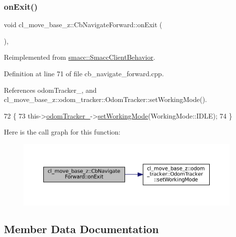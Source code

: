 \subsubsection{\texorpdfstring{on\+Exit()}{onExit()}}
{\footnotesize\ttfamily void cl\+\_\+move\+\_\+base\+\_\+z\+::\+Cb\+Navigate\+Forward\+::on\+Exit (\begin{DoxyParamCaption}{ }\end{DoxyParamCaption})\hspace{0.3cm}{\ttfamily [override]}, {\ttfamily [virtual]}}



Reimplemented from \hyperlink{classsmacc_1_1SmaccClientBehavior_ac0cd72d42bd00425362a97c9803ecce5}{smacc\+::\+Smacc\+Client\+Behavior}.



Definition at line 71 of file cb\+\_\+navigate\+\_\+forward.\+cpp.



References odom\+Tracker\+\_\+, and cl\+\_\+move\+\_\+base\+\_\+z\+::odom\+\_\+tracker\+::\+Odom\+Tracker\+::set\+Working\+Mode().


\begin{DoxyCode}
72 \{
73     this->\hyperlink{classcl__move__base__z_1_1CbNavigateForward_a7583a4d669af48618bd45950db8e5292}{odomTracker\_}->\hyperlink{classcl__move__base__z_1_1odom__tracker_1_1OdomTracker_aeed01bdefd9a1cc709b0b3e4eed285ed}{setWorkingMode}(WorkingMode::IDLE);
74 \}
\end{DoxyCode}
Here is the call graph for this function\+:
\nopagebreak
\begin{figure}[H]
\begin{center}
\leavevmode
\includegraphics[width=350pt]{classcl__move__base__z_1_1CbNavigateForward_a2160484562ef5fb1c655fab7f990241e_cgraph}
\end{center}
\end{figure}


\subsection{Member Data Documentation}
\mbox{\label{classcl__move__base__z_1_1CbNavigateForward_a41bc9c319c64be6302f7365173ccd2c5}} 

